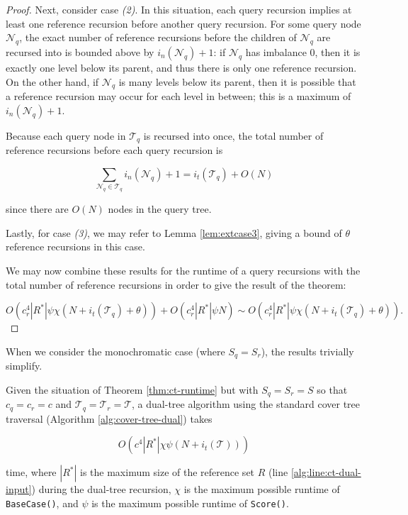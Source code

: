 \begin{proof}
Next, consider case \textit{(2)}.  In this situation, each query recursion
implies at least one reference recursion before another query recursion.  For
some query node $\mathscr{N}_q$, the exact number of reference recursions before
the children of $\mathscr{N}_q$ are recursed into is bounded above by
$i_n(\mathscr{N}_q) + 1$: if $\mathscr{N}_q$ has imbalance $0$, then it is
exactly one level below its parent, and thus there is only one reference
recursion.  On the other hand, if $\mathscr{N}_q$ is many levels below its
parent, then it is possible that a reference recursion may occur for each level
in between; this is a maximum of $i_n(\mathscr{N}_q) + 1$.

Because each query node in $\mathscr{T}_q$ is recursed into once, the total
number of reference recursions before each query recursion is

\begin{equation}
\sum_{\mathscr{N}_q \in \mathscr{T}_q} i_n(\mathscr{N}_q) + 1 = i_t(\mathscr{T}_q) +
O(N)
\end{equation}

\noindent since there are $O(N)$ nodes in the query tree.

Lastly, for case \textit{(3)}, we may refer to Lemma \ref{lem:extcase3}, giving
a bound of $\theta$ reference recursions in this case.

We may now combine these results for the runtime of a query recursions with the
total number of reference recursions in order to give the result of the theorem:

\begin{equation}
O\left(c_r^4 |R^*| \psi \chi \left(N + i_t(\mathscr{T}_q) + \theta\right)\right)
+ O\left(c_r^4 |R^*| \psi N\right) \sim O\left(c_r^4 |R^*| \psi
\chi \left(N + i_t(\mathscr{T}_q) + \theta\right)\right).
\end{equation}
\end{proof}

When we consider the monochromatic case (where $S_q = S_r$), the results
trivially simplify.

\begin{cor}
\label{cor:ct-runtime-mono}
Given the situation of Theorem \ref{thm:ct-runtime} but with $S_q = S_r = S$ so
that $c_q = c_r = c$ and $\mathscr{T}_q = \mathscr{T}_r = \mathscr{T}$, a
dual-tree algorithm using the standard cover tree traversal (Algorithm
\ref{alg:cover-tree-dual}) takes

\begin{equation}
O\left(c^4 |R^*| \chi \psi \left(N + i_t(\mathscr{T})\right)\right)
\end{equation}

\noindent time, where $ | R^* | $ is the maximum size of the reference set $R$
(line \ref{alg:line:ct-dual-input}) during the dual-tree recursion, $\chi$ is
the maximum possible runtime of \texttt{BaseCase()}, and $\psi$ is the maximum
possible runtime of \texttt{Score()}.
\end{cor}

